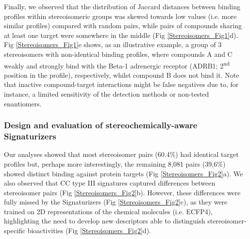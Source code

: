 Finally, we observed that the distribution of Jaccard distances between binding profiles within stereoisomeric groups was skewed towards low values (i.e. more similar profiles) compared with random pairs, while pairs of compounds sharing at least one target were somewhere in the middle (Fig \ref{Stereoisomers_Fig1}d). Fig \ref{Stereoisomers_Fig1}e shows, as an illustrative example, a group of 3 stereoisomers with non-identical binding profiles, where compounds A and C weakly and strongly bind with the Beta-1 adrenergic receptor (ADRB1; 2\textsuperscript{nd} position in the profile), respectively, whilst compound B does not bind it. Note that inactive compound-target interactions might be false negatives due to, for instance, a limited sensitivity of the detection methods or non-tested enantiomers.




\subsubsection{Design and evaluation of stereochemically-aware Signaturizers}
\label{Stereoisomers_Design_Evaluation_Signaturizers}

Our analyses showed that most stereoisomer pairs (60.4\%) had identical target profiles but, perhaps more interestingly, the remaining 8,081 pairs (39,6\%) showed distinct binding against protein targets (Fig \ref{Stereoisomers_Fig2}a). We also observed that CC type III signatures captured differences between stereoisomer pairs (Fig \ref{Stereoisomers_Fig2}b). However, these differences were fully missed by the Signaturizers (Fig \ref{Stereoisomers_Fig2}c), as they were trained on 2D representations of the chemical molecules (i.e. ECFP4\cite{rogers_extended-connectivity_2010}), highlighting the need to develop new descriptors able to distinguish stereoisomer-specific bioactivities (Fig \ref{Stereoisomers_Fig2}d).

